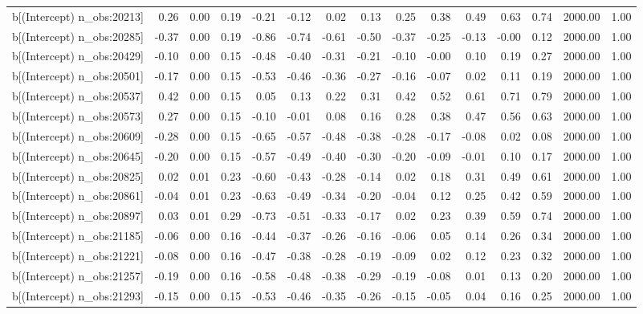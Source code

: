 \begin{table}[ht]
\begin{tabular}{rrrrrrrrrrrrrrr}
  b[(Intercept) n\_obs:20213] & 0.26 & 0.00 & 0.19 & -0.21 & -0.12 & 0.02 & 0.13 & 0.25 & 0.38 & 0.49 & 0.63 & 0.74 & 2000.00 & 1.00 \\ 
  b[(Intercept) n\_obs:20285] & -0.37 & 0.00 & 0.19 & -0.86 & -0.74 & -0.61 & -0.50 & -0.37 & -0.25 & -0.13 & -0.00 & 0.12 & 2000.00 & 1.00 \\ 
  b[(Intercept) n\_obs:20429] & -0.10 & 0.00 & 0.15 & -0.48 & -0.40 & -0.31 & -0.21 & -0.10 & -0.00 & 0.10 & 0.19 & 0.27 & 2000.00 & 1.00 \\ 
  b[(Intercept) n\_obs:20501] & -0.17 & 0.00 & 0.15 & -0.53 & -0.46 & -0.36 & -0.27 & -0.16 & -0.07 & 0.02 & 0.11 & 0.19 & 2000.00 & 1.00 \\ 
  b[(Intercept) n\_obs:20537] & 0.42 & 0.00 & 0.15 & 0.05 & 0.13 & 0.22 & 0.31 & 0.42 & 0.52 & 0.61 & 0.71 & 0.79 & 2000.00 & 1.00 \\ 
  b[(Intercept) n\_obs:20573] & 0.27 & 0.00 & 0.15 & -0.10 & -0.01 & 0.08 & 0.16 & 0.28 & 0.38 & 0.47 & 0.56 & 0.63 & 2000.00 & 1.00 \\ 
  b[(Intercept) n\_obs:20609] & -0.28 & 0.00 & 0.15 & -0.65 & -0.57 & -0.48 & -0.38 & -0.28 & -0.17 & -0.08 & 0.02 & 0.08 & 2000.00 & 1.00 \\ 
  b[(Intercept) n\_obs:20645] & -0.20 & 0.00 & 0.15 & -0.57 & -0.49 & -0.40 & -0.30 & -0.20 & -0.09 & -0.01 & 0.10 & 0.17 & 2000.00 & 1.00 \\ 
  b[(Intercept) n\_obs:20825] & 0.02 & 0.01 & 0.23 & -0.60 & -0.43 & -0.28 & -0.14 & 0.02 & 0.18 & 0.31 & 0.49 & 0.61 & 2000.00 & 1.00 \\ 
  b[(Intercept) n\_obs:20861] & -0.04 & 0.01 & 0.23 & -0.63 & -0.49 & -0.34 & -0.20 & -0.04 & 0.12 & 0.25 & 0.42 & 0.59 & 2000.00 & 1.00 \\ 
  b[(Intercept) n\_obs:20897] & 0.03 & 0.01 & 0.29 & -0.73 & -0.51 & -0.33 & -0.17 & 0.02 & 0.23 & 0.39 & 0.59 & 0.74 & 2000.00 & 1.00 \\ 
  b[(Intercept) n\_obs:21185] & -0.06 & 0.00 & 0.16 & -0.44 & -0.37 & -0.26 & -0.16 & -0.06 & 0.05 & 0.14 & 0.26 & 0.34 & 2000.00 & 1.00 \\ 
  b[(Intercept) n\_obs:21221] & -0.08 & 0.00 & 0.16 & -0.47 & -0.38 & -0.28 & -0.19 & -0.09 & 0.02 & 0.12 & 0.23 & 0.32 & 2000.00 & 1.00 \\ 
  b[(Intercept) n\_obs:21257] & -0.19 & 0.00 & 0.16 & -0.58 & -0.48 & -0.38 & -0.29 & -0.19 & -0.08 & 0.01 & 0.13 & 0.20 & 2000.00 & 1.00 \\ 
  b[(Intercept) n\_obs:21293] & -0.15 & 0.00 & 0.15 & -0.53 & -0.46 & -0.35 & -0.26 & -0.15 & -0.05 & 0.04 & 0.16 & 0.25 & 2000.00 & 1.00 \\ 

\end{tabular}
\end{table}
